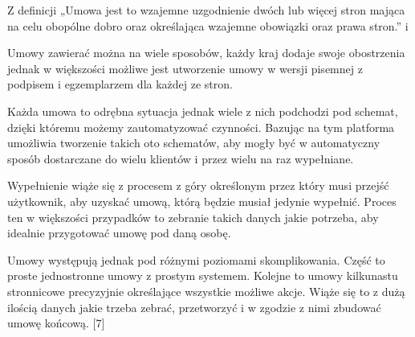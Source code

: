 Z definicji „Umowa jest to wzajemne uzgodnienie dwóch lub więcej stron mająca na celu obopólne dobro oraz określająca wzajemne obowiązki oraz prawa stron.” i 

Umowy zawierać można na wiele sposobów, każdy kraj dodaje swoje obostrzenia jednak w większości możliwe jest utworzenie umowy w wersji pisemnej z podpisem i egzemplarzem dla każdej ze stron.  

Każda umowa to odrębna sytuacja jednak wiele z nich podchodzi pod schemat, dzięki któremu możemy zautomatyzować czynności. Bazując na tym platforma umożliwia tworzenie takich oto schematów, aby mogły być w automatyczny sposób dostarczane do wielu klientów i przez wielu na raz wypełniane. 

Wypełnienie wiąże się z procesem z góry określonym przez który musi przejść użytkownik, aby uzyskać umową, którą będzie musiał jedynie wypełnić. Proces ten w większości przypadków to zebranie takich danych jakie potrzeba, aby idealnie przygotować umowę pod daną osobę. 

Umowy występują jednak pod różnymi poziomami skomplikowania. Część to proste jednostronne umowy z prostym systemem. Kolejne to umowy kilkunastu stronnicowe precyzyjnie określające wszystkie możliwe akcje. Wiąże się to z dużą ilością danych jakie trzeba zebrać, przetworzyć i w zgodzie z nimi zbudować umowę końcową. [7] 
